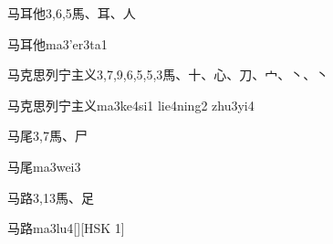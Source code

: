 \begin{Entry}{马耳他}{3,6,5}{⾺、⽿、⼈}
  \begin{Phonetics}{马耳他}{ma3'er3ta1}
  \end{Phonetics}
\end{Entry}

\begin{Entry}{马克思列宁主义}{3,7,9,6,5,5,3}{⾺、⼗、⼼、⼑、⼧、⼂、⼂}
  \begin{Phonetics}{马克思列宁主义}{ma3ke4si1 lie4ning2 zhu3yi4}
  \end{Phonetics}
\end{Entry}

\begin{Entry}{马尾}{3,7}{⾺、⼫}
  \begin{Phonetics}{马尾}{ma3wei3}
  \end{Phonetics}
\end{Entry}

\begin{Entry}{马路}{3,13}{⾺、⾜}
  \begin{Phonetics}{马路}{ma3lu4}[][HSK 1]
  \end{Phonetics}
\end{Entry}


